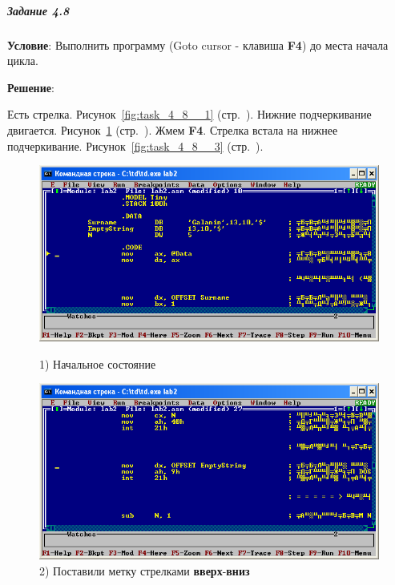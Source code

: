 \subparagraph{Задание 4.8}

\textbf{Условие}:
Выполнить программу (Goto cursor - клавиша \textbf{F4}) до места начала цикла. 

\textbf{Решение}:

Есть стрелка.
Рисунок~\ref{fig:task_4_8__1} (стр.~\pageref{fig:task_4_8__1}).
Нижние подчеркивание двигается.
Рисунок~\ref{fig:task_4_8__2} (стр.~\pageref{fig:task_4_8__2}).
Жмем \textbf{F4}. Стрелка встала на нижнее подчеркивание.
Рисунок~\ref{fig:task_4_8__3} (стр.~\pageref{fig:task_4_8__3}).

\begin{figure}[!htp]
    \centering
    \begin{minipage}{0.32\textwidth}
        \centering
        \includegraphics[width=.99\linewidth]
            {../_INCLUDES/task-4-8/1.png}
        \caption{1) Начальное состояние}
        \label{fig:task_4_8__1}
    \end{minipage}
    \begin {minipage}{0.32\textwidth}
        \centering
        \includegraphics[width=.99\linewidth]
            {../_INCLUDES/task-4-8/2.png}
        \caption{2) Поставили метку стрелками \textbf{вверх}-\textbf{вниз}}
        \label{fig:task_4_8__2}

\end{minipage}
\end{figure}
